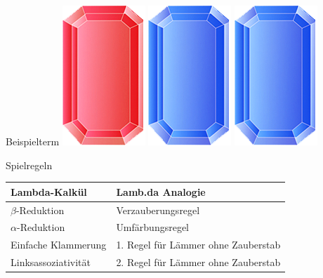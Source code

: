 \documentclass[18pt]{beamer}
\begin{document}
\begin{frame}{Beispielterm}
	\hspace{0.5cm} \includegraphics[scale=0.5]{pictures/gem_red} \hspace{0.05cm} \hspace{1.7cm} \includegraphics[scale=0.5]{pictures/gem_blue} \hspace{0.05cm} \includegraphics[scale=0.5]{pictures/gem_blue} \\
\end{frame}

\begin{frame}{Spielregeln}
	\centering
	\begin{tabular}[h]{l | l}
	Lambda-Kalkül & Lamb.da Analogie \\
	\hline
	$\beta$-Reduktion & Verzauberungsregel \\
	$\alpha$-Reduktion & Umfärbungsregel \\
	Einfache Klammerung & 1. Regel für Lämmer ohne Zauberstab \\
	Linksassoziativität & 2. Regel für Lämmer ohne Zauberstab
	\end{tabular}
\end{frame}
\end{document}
